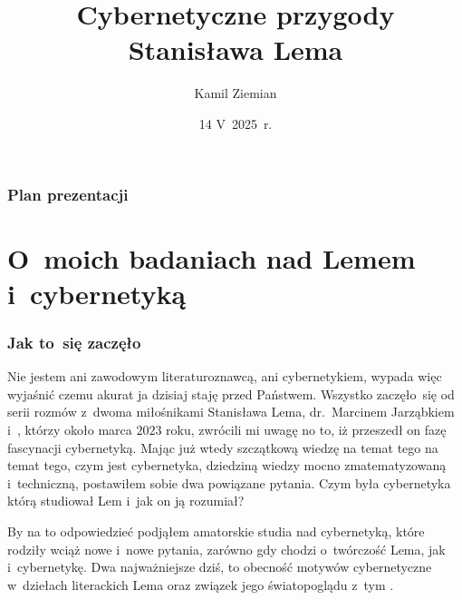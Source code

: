 \documentclass[10pt,t]{beamer}
\title{Cybernetyczne przygody Stanisława Lema}
\author{Kamil Ziemian \\
  \email}
\date[14 V~2025~r.]{14 V~2025~r.}
\begin{document}





\RaggedRight





\maketitle





\begin{frame}
  \frametitle{Plan prezentacji}


  \tableofcontents

\end{frame}










\section{O~moich badaniach nad Lemem i~cybernetyką}



\begin{frame}
  \frametitle{Jak to~się zaczęło}


  Nie jestem ani zawodowym literaturoznawcą, ani cybernetykiem, wypada więc
  wyjaśnić czemu akurat ja dzisiaj staję przed Państwem. Wszystko
  zaczęło~się od serii rozmów z~dwoma miłośnikami Stanisława Lema,
  {dr.~Marcinem Jarząbkiem}
  i~, którzy około marca $2023$ roku, zwrócili mi uwagę no to,
  iż przeszedł on fazę fascynacji cybernetyką. Mając już wtedy szczątkową
  wiedzę na temat tego na temat tego, czym jest cybernetyka, dziedziną
  wiedzy mocno zmatematyzowaną i~techniczną, postawiłem sobie dwa powiązane
  pytania. Czym była cybernetyka którą studiował Lem i~jak on ją rozumiał?

  By na to odpowiedzieć podjąłem amatorskie studia nad cybernetyką, które
  rodziły wciąż nowe i~nowe pytania, zarówno gdy chodzi o~twórczość Lema,
  jak i~cybernetykę. Dwa najważniejsze dziś, to obecność motywów
  cybernetyczne w~dziełach literackich Lema oraz związek jego światopoglądu
  z~tym .

\end{frame}
\end{document}
